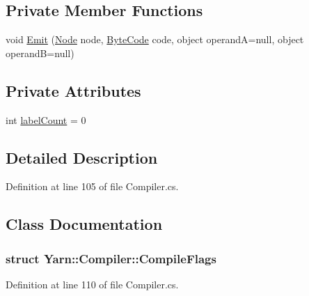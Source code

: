 \subsection*{Private Member Functions}
\begin{DoxyCompactItemize}
\item 
void \hyperlink{a00051_a774e8c143cdda0584fcfdda98626a83c}{Emit} (\hyperlink{a00048_a00351}{Node} node, \hyperlink{a00048_ad5dfb6ee68ca7469623ad3e459f98894}{Byte\-Code} code, object operand\-A=null, object operand\-B=null)
\end{DoxyCompactItemize}
\subsection*{Private Attributes}
\begin{DoxyCompactItemize}
\item 
int \hyperlink{a00051_a87758397eba2e84cda8e0d6c40656f3f}{label\-Count} = 0
\end{DoxyCompactItemize}


\subsection{Detailed Description}


Definition at line 105 of file Compiler.\-cs.



\subsection{Class Documentation}
\label{a00347}
\hypertarget{a00051_a00347}{}
\subsubsection{struct Yarn\-:\-:Compiler\-:\-:Compile\-Flags}


Definition at line 110 of file Compiler.\-cs.



